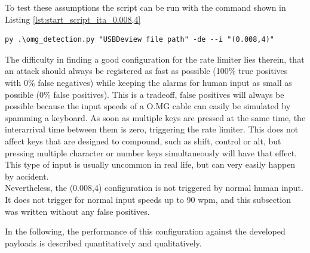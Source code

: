 To test these assumptions the script can be run with the command shown in Listing \ref{lst:start_script_ita_0.008,4}


\begin{lstlisting}[caption={start defence Script with ITA (0.008,4)},label={lst:start_script_ita_0.008,4}, captionpos=b]
 py .\omg_detection.py "USBDeview file path" -de --i "(0.008,4)"
\end{lstlisting}

The difficulty in finding a good configuration for the rate limiter lies therein, that an attack should always be registered as fast as possible (100\% true positives with 0\% false negatives) while keeping the alarms for human input as small as possible (0\% false positives).
This is a tradeoff, false positives will always be possible because the input speeds of a O.MG cable can easily be simulated by spamming a keyboard. As soon as multiple keys are pressed at the same time, the interarrival time between them is zero, triggering the rate limiter. This does not affect keys that are designed to compound, such as shift, control or alt, but pressing multiple character or number keys simultaneously will have that effect. This type of input is usually uncommon in real life, but can very easily happen by accident. \\
Nevertheless, the (0.008,4) configuration is not triggered by normal human input. It does not trigger for normal input speeds up to 90 wpm, and this subsection was written without any false positives. 

In the following, the performance of this configuration against the developed payloads is described quantitatively and qualitatively.

